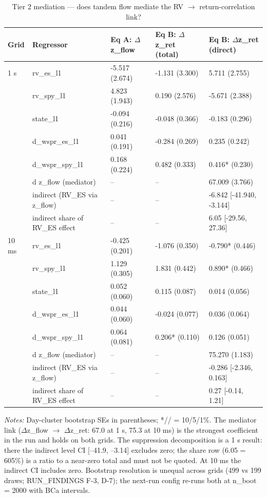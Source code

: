 \begin{table}[htbp]\centering
\caption{Tier 2 mediation — does tandem flow mediate the RV $\rightarrow$ return-correlation link?}
\label{tab:t6}
\small
\begin{tabular}{lllll}
\toprule
Grid & Regressor & Eq A: $\Delta$z\_flow & Eq B: $\Delta$z\_ret (total) & Eq B: $\Delta$z\_ret (direct) \\
\midrule
1 s & rv\_es\_l1 & -5.517\sym{**} (2.674) & -1.131 (3.300) & 5.711\sym{**} (2.755) \\
 & rv\_spy\_l1 & 4.823\sym{**} (1.943) & 0.190 (2.576) & -5.671\sym{**} (2.388) \\
 & state\_l1 & -0.094 (0.216) & -0.048 (0.366) & -0.183 (0.296) \\
 & d\_wspr\_es\_l1 & 0.041 (0.191) & -0.284 (0.269) & 0.235 (0.242) \\
 & d\_wspr\_spy\_l1 & 0.168 (0.224) & 0.482 (0.333) & 0.416* (0.230) \\
 & d z\_flow (mediator) & -- & -- & 67.009\sym{\sym{**}*} (3.766) \\
 & indirect (RV\_ES via z\_flow) & -- & -- & -6.842 [-41.940, -3.144] \\
 & indirect share of RV\_ES effect & -- & -- & 6.05 [-29.56, 27.36] \\
\midrule
10 ms & rv\_es\_l1 & -0.425\sym{**} (0.201) & -1.076\sym{\sym{**}*} (0.350) & -0.790* (0.446) \\
 & rv\_spy\_l1 & 1.129\sym{\sym{**}*} (0.305) & 1.831\sym{\sym{**}*} (0.442) & 0.890* (0.466) \\
 & state\_l1 & 0.052 (0.060) & 0.115 (0.087) & 0.014 (0.056) \\
 & d\_wspr\_es\_l1 & 0.044 (0.060) & -0.024 (0.077) & 0.036 (0.064) \\
 & d\_wspr\_spy\_l1 & 0.064 (0.081) & 0.206* (0.110) & 0.126\sym{**} (0.051) \\
 & d z\_flow (mediator) & -- & -- & 75.270\sym{\sym{**}*} (1.183) \\
 & indirect (RV\_ES via z\_flow) & -- & -- & -0.286 [-2.346, 0.163] \\
 & indirect share of RV\_ES effect & -- & -- & 0.27 [-0.14, 1.21] \\
\bottomrule
\end{tabular}
\begin{minipage}{\linewidth}\vspace{2pt}\footnotesize\emph{Notes:} Day-cluster bootstrap SEs in parentheses; */\sym{**}/\sym{\sym{**}*} = 10/5/1\%. The mediator link ($\Delta$z\_flow $\rightarrow$ $\Delta$z\_ret: 67.0 at 1 s, 75.3 at 10 ms) is the strongest coefficient in the run and holds on both grids. The suppression decomposition is a 1 s result: there the indirect level CI [--41.9, --3.14] excludes zero; the share row (6.05 = 605\%) is a ratio to a near-zero total and must not be quoted. At 10 ms the indirect CI includes zero. Bootstrap resolution is unequal across grids (499 vs 199 draws; RUN\_FINDINGS F-3, D-7); the next-run config re-runs both at n\_boot = 2000 with BCa intervals.\end{minipage}
\end{table}
